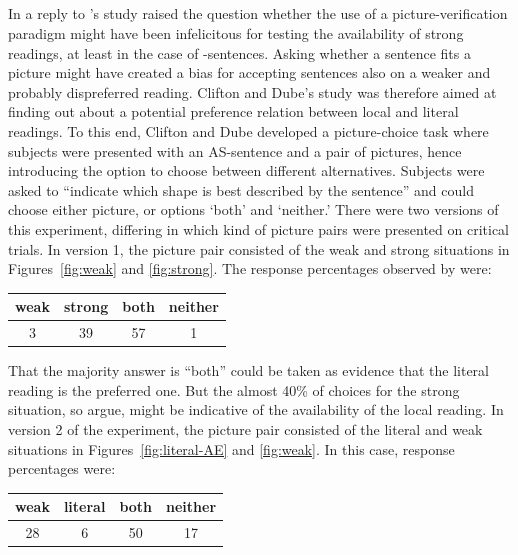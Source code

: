 \documentclass[fleqn,reqno,10pt,draft]{article}
\newcommand{\as}{\acro{as}}
\begin{document}
\subsection{\citet{CliftonDube2010:Embedded-Implic}}
\label{sec:clifton-dube}

In a reply to \citeauthor{GeurtsPouscoulous2009:Embedded-Implic}'s
study \citeauthor{CliftonDube2010:Embedded-Implic} raised the question
whether the use of a picture-verification paradigm might have been
infelicitous for testing the availability of strong readings, at least
in the case of \as-sentences. Asking whether a sentence fits a picture
might have created a bias for accepting sentences also on a weaker and
probably dispreferred reading. Clifton and Dube's study was therefore
aimed at finding out about a potential preference relation between
local and literal readings. To this end, Clifton and Dube developed a
picture-choice task where subjects were presented with an AS-sentence
and a pair of pictures, hence introducing the option to choose between
different alternatives. Subjects were asked to ``indicate which shape
is best described by the sentence'' and could choose either picture,
or options `both' and `neither.' There were two versions of this
experiment, differing in which kind of picture pairs were presented on
critical trials. In version 1, the picture pair consisted of the weak
and strong situations in Figures~\ref{fig:weak} and
\ref{fig:strong}. The response percentages observed by
\citeauthor{CliftonDube2010:Embedded-Implic} were:

\begin{center}
  \begin{tabular}{cccc}
    weak & strong & both & neither
    \\ \midrule 
 3 & 39 & 57 & 1 
  \end{tabular}
\end{center}

\noindent That the majority answer is ``both'' could be taken as
evidence that the literal reading is the preferred one. But the almost
40\% of choices for the strong situation, so
\citeauthor{CliftonDube2010:Embedded-Implic} argue, might be
indicative of the availability of the local reading. In version 2 of
the experiment, the picture pair consisted of the literal and weak
situations in Figures~\ref{fig:literal-AE} and \ref{fig:weak}. In this
case, response percentages were:

\begin{center}
  \begin{tabular}{cccc}
    weak & literal & both & neither
    \\ \midrule 
    28 & 6 & 50 & 17 
  \end{tabular}
\end{center}
\end{document}
